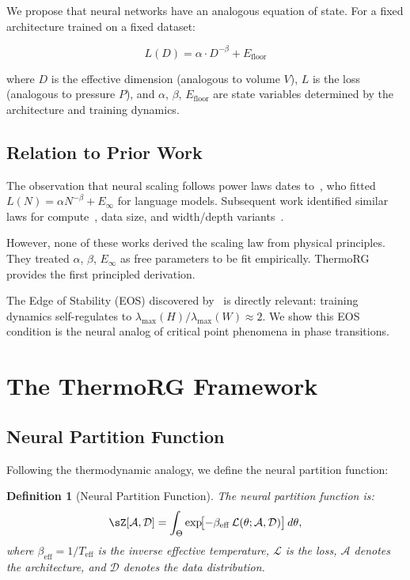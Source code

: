 \documentclass[11pt, a4paper]{article}
\newtheorem{dfn}[theo]{Definition}
\theoremstyle{plain}
\begin{document}
We propose that neural networks have an analogous equation of state. For a fixed architecture trained on a fixed dataset:

\begin{equation}
L(D) = \alpha \cdot D^{-\beta} + E_{\mathrm{floor}}
\end{equation}

where $D$ is the effective dimension (analogous to volume $V$), $L$ is the loss (analogous to pressure $P$), and $\alpha$, $\beta$, $E_{\mathrm{floor}}$ are state variables determined by the architecture and training dynamics.

\subsection{Relation to Prior Work}

The observation that neural scaling follows power laws dates to~\citet{kaplan2020scaling}, who fitted $L(N) = \alpha N^{-\beta} + E_\infty$ for language models. Subsequent work identified similar laws for compute~\citep{hoffmann2022training}, data size, and width/depth variants~\citep{valentino2022scaling}.

However, none of these works derived the scaling law from physical principles. They treated $\alpha$, $\beta$, $E_\infty$ as free parameters to be fit empirically. ThermoRG provides the first principled derivation.

The Edge of Stability (EOS) discovered by~\citet{cohen2021theory} is directly relevant: training dynamics self-regulates to $\lambda_{\max}(H)/\lambda_{\max}(W) \approx 2$. We show this EOS condition is the neural analog of critical point phenomena in phase transitions.

\section{The ThermoRG Framework}

\subsection{Neural Partition Function}

Following the thermodynamic analogy, we define the neural partition function:

\begin{dfn}[Neural Partition Function]\label{dfn:partition}
The neural partition function is:
\begin{equation}
\sZ[\mathcal{A}, \mathcal{D}] = \int_{\Theta} \exp\!\bigl[-\beta_{\mathrm{eff}} \, \mathcal{L}(\theta; \mathcal{A}, \mathcal{D})\bigr] \, d\theta,
\end{equation}
where $\beta_{\mathrm{eff}} = 1/T_{\mathrm{eff}}$ is the inverse effective temperature, $\mathcal{L}$ is the loss, $\mathcal{A}$ denotes the architecture, and $\mathcal{D}$ denotes the data distribution.
\end{dfn}
\end{document}
